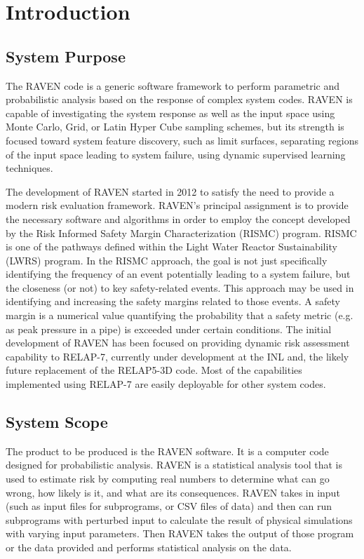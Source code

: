 \section{Introduction}

\subsection{System Purpose}

The RAVEN code is a generic software framework to perform parametric
and probabilistic analysis based on the response of complex system
codes. RAVEN is capable of investigating the system response as well
as the input space using Monte Carlo, Grid, or Latin Hyper Cube
sampling schemes, but its strength is focused toward system feature
discovery, such as limit surfaces, separating regions of the input
space leading to system failure, using dynamic supervised learning
techniques.

The development of RAVEN started in 2012 to satisfy the need to
provide a modern risk evaluation framework. RAVEN's principal
assignment is to provide the necessary software and algorithms in
order to employ the concept developed by the Risk Informed Safety
Margin Characterization (RISMC) program. RISMC is one of the pathways
defined within the Light Water Reactor Sustainability (LWRS)
program. In the RISMC approach, the goal is not just specifically
identifying the frequency of an event potentially leading to a system
failure, but the closeness (or not) to key safety-related events. This
approach may be used in identifying and increasing the safety margins
related to those events. A safety margin is a numerical value
quantifying the probability that a safety metric (e.g. as peak
pressure in a pipe) is exceeded under certain conditions. The initial
development of RAVEN has been focused on providing dynamic risk
assessment capability to RELAP-7, currently under development at the
INL and, the likely future replacement of the RELAP5-3D code. Most of
the capabilities implemented using RELAP-7 are easily deployable for
other system codes.

\subsection{System Scope}

The product to be produced is the RAVEN software.  It is a computer
code designed for probabilistic analysis.  RAVEN is a statistical
analysis tool that is used to estimate risk by computing real numbers
to determine what can go wrong, how likely is it, and what are its
consequences.  RAVEN takes in input (such as input files for
subprograms, or CSV files of data) and then can run subprograms with
perturbed input to calculate the result of physical simulations with
varying input parameters.  Then RAVEN takes the output of those
program or the data provided and performs statistical analysis on the
data.

